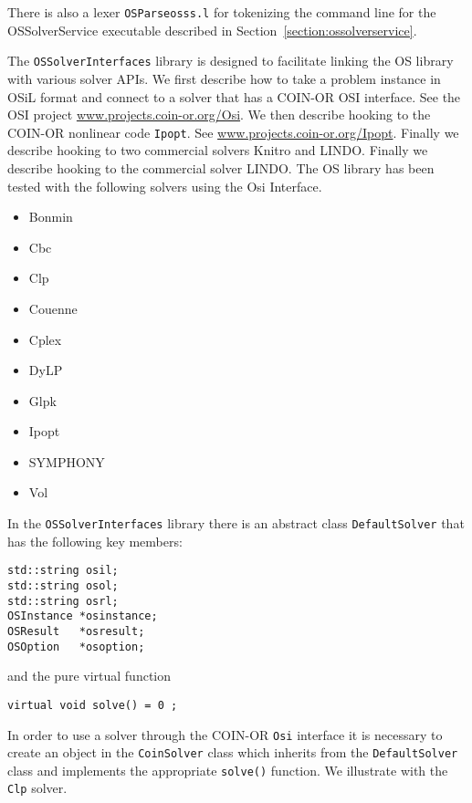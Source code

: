 There is also a lexer {\tt OSParseosss.l} for tokenizing the command line for the OSSolverService executable 
described in Section~\ref{section:ossolverservice}.
\fi

\ifbible

\fi

\label{section:ossolverinterfaces}


The {\tt OSSolverInterfaces} library is designed to facilitate linking the OS library with various solver APIs.
We first describe how to take a problem instance in OSiL format and connect to a solver 
that has a COIN-OR OSI interface. See the OSI project \url{www.projects.coin-or.org/Osi}.
We then describe hooking to the COIN-OR nonlinear code {\tt Ipopt}. 
See \url{www.projects.coin-or.org/Ipopt}.
\ifknitro
Finally we describe hooking to two commercial solvers Knitro and LINDO.
\else
Finally we describe hooking to the commercial solver LINDO.
\fi
The OS library has been tested with the following solvers using the Osi Interface.

\begin{itemize}
\item Bonmin
\item Cbc
\item Clp
\item Couenne
\item Cplex
\item DyLP
\item Glpk
\item Ipopt
\item SYMPHONY
\item Vol
\end{itemize}

In the {\tt OSSolverInterfaces} library there is an abstract class
{\tt DefaultSolver} that has the following key members:

\begin{verbatim}
std::string osil;
std::string osol;
std::string osrl;
OSInstance *osinstance;
OSResult   *osresult;
OSOption   *osoption;
\end{verbatim}
and the pure virtual function
\begin{verbatim}
virtual void solve() = 0 ;
\end{verbatim}
In order to use a solver through the COIN-OR {\tt Osi} 
interface it is
necessary to create an object in the {\tt CoinSolver} class which inherits
from the {\tt DefaultSolver} class and implements the appropriate
{\tt solve()} function.  We illustrate with the {\tt Clp} solver.

